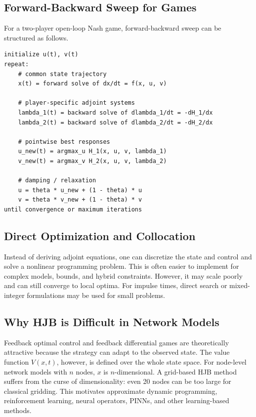 \documentclass[11pt,a4paper]{article}
\begin{document}
\subsection{Forward-Backward Sweep for Games}

For a two-player open-loop Nash game, forward-backward sweep can be structured as follows.

\begin{lstlisting}[caption={Forward-backward sweep for an open-loop Nash game.}]
initialize u(t), v(t)
repeat:
    # common state trajectory
    x(t) = forward solve of dx/dt = f(x, u, v)

    # player-specific adjoint systems
    lambda_1(t) = backward solve of dlambda_1/dt = -dH_1/dx
    lambda_2(t) = backward solve of dlambda_2/dt = -dH_2/dx

    # pointwise best responses
    u_new(t) = argmax_u H_1(x, u, v, lambda_1)
    v_new(t) = argmax_v H_2(x, u, v, lambda_2)

    # damping / relaxation
    u = theta * u_new + (1 - theta) * u
    v = theta * v_new + (1 - theta) * v
until convergence or maximum iterations
\end{lstlisting}

\subsection{Direct Optimization and Collocation}

Instead of deriving adjoint equations, one can discretize the state and control and solve a nonlinear programming problem. This is often easier to implement for complex models, bounds, and hybrid constraints. However, it may scale poorly and can still converge to local optima. For impulse times, direct search or mixed-integer formulations may be used for small problems.

\subsection{Why HJB is Difficult in Network Models}

Feedback optimal control and feedback differential games are theoretically attractive because the strategy can adapt to the observed state. The value function $V(x,t)$, however, is defined over the whole state space. For node-level network models with $n$ nodes, $x$ is $n$-dimensional. A grid-based HJB method suffers from the curse of dimensionality: even 20 nodes can be too large for classical gridding. This motivates approximate dynamic programming, reinforcement learning, neural operators, PINNs, and other learning-based methods.
\end{document}
